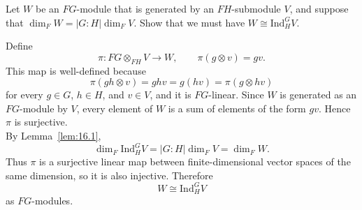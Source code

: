 \documentclass[../Odyssey_Project.tex]{subfiles}
\begin{document}
\begin{exercise}
\label{ex:16.2}
Let $W$ be an $FG$-module that is generated by an $FH$-submodule $V$, and suppose that $\dim_F W = |G : H| \dim_F V$. Show that we must have $W \cong \mathrm{Ind}_H^G V$.
\end{exercise}
\begin{solution}
    Define
    \[
        \pi\colon FG\otimes_{FH}V\to W,
        \qquad
        \pi(g\otimes v)=gv.
    \]
    This map is well-defined because
    \[
        \pi(gh\otimes v)=ghv=g(hv)=\pi(g\otimes hv)
    \]
    for every $g\in G$, $h\in H$, and $v\in V$, and it is $FG$-linear. Since $W$ is generated as an $FG$-module by $V$, every element of $W$ is a sum of elements of the form $gv$. Hence $\pi$ is surjective.\\
    By Lemma~\ref{lem:16.1},
    \[
        \dim_F\mathrm{Ind}_H^G V
        =
        |G : H|\dim_FV
        =
        \dim_FW.
    \]
    Thus $\pi$ is a surjective linear map between finite-dimensional vector spaces of the same dimension, so it is also injective. Therefore
    \[
        W\cong\mathrm{Ind}_H^G V
    \]
    as $FG$-modules.
\end{solution}
\end{document}
